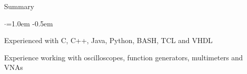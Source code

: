 \documentclass{resume} %
\begin{document}
	
	
	\begin{rSection}{Summary}
		\vspace {0.5em}
		\begin{list}{$\cdot$}{\leftmargin=1.0em}
			\itemsep -0.5em \vspace{-0.5em}
			\item Experienced with C, C++, Java, Python, BASH, TCL and VHDL			
			\item Experience working with oscilloscopes, function generators, multimeters and VNAs
		\end{list}
		\vspace{0.5em}
	\end{rSection}
	
	
\end{document}
